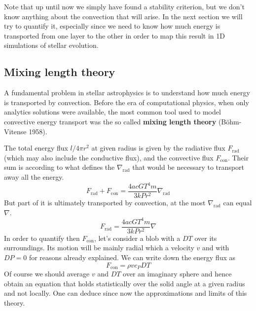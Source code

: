 Note that up until now we simply have found a stability criterion, but we don't know anything about the convection that will arise. In the next section we will try to quantify it, especially since we need to know how much energy is transported from one layer to the other in order to map this result in 1D simulations of stellar evolution.

\subsection{Mixing length theory}
A fundamental problem in stellar astrophysics is to understand how much energy is transported by convection. Before the era of computational physics, when only analytics solutions were available, the most common tool used to model convective energy transport was the so called \textbf{mixing length theory} (Böhm-Vitense 1958). 

The total energy flux $l/4 \pi r^2$ at given radius is given by the radiative flux $F_{\mathrm{rad}}$ (which may also include the conductive flux), and the convective flux $F_{\mathrm{con}}$. Their sum is according to \label{nablarad} what defines the $\nabla_{\mathrm{rad}}$ that would be necessary to transport away all the energy.
\begin{equation}\label{7.1}
F_{\mathrm{rad}}+ F_{\mathrm{con}}= \frac{4 a c G T^4 m }{3 k P r^2} \nabla_{\mathrm{rad}}
\end{equation}
But part of it is ultimately transported by convection, at the most $\nabla_{\mathrm{rad}}$ can equal $\nabla$. 
\begin{equation}\label{7.2}
F_{\mathrm{rad}}= \frac{4 a c G T^4 m}{3 k P r^2} \nabla
\end{equation}
In order to quantify then $F_{\mathrm{con}}$, let's consider a blob with a $DT$ over its surroundings. Its motion will be mainly radial which a velocity $v$ and with $DP=0$ for reasons already explained. We can write down the energy flux as
\begin{equation}\label{fconv}
	F_{\mathrm{con}}=\rho  v  c_P  DT
\end{equation}
Of course we should average $v$ and $DT$ over an imaginary sphere and hence obtain an equation that holds statistically over the solid angle at a given radius and not locally. One can deduce since now the approximations and limits of this theory. 

